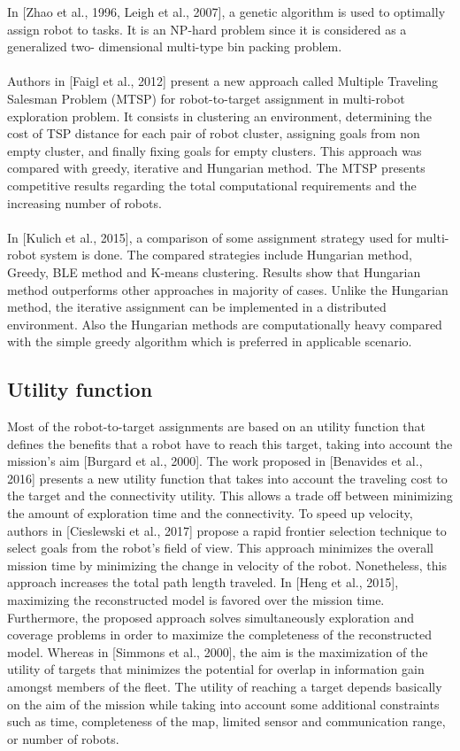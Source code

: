 \documentclass[11pt,openany]{book}
\begin{document}
In [Zhao et al., 1996, Leigh et al., 2007], a genetic algorithm is used to optimally assign robot to tasks. It is an NP-hard problem since it is considered as a generalized two- dimensional multi-type bin packing problem.\\\\
Authors in [Faigl et al., 2012] present a new approach called Multiple Traveling Salesman Problem (MTSP) for robot-to-target assignment in multi-robot exploration problem. It consists in clustering an environment, determining the cost of TSP distance for each pair of robot cluster, assigning goals from non empty cluster, and ﬁnally ﬁxing goals for empty clusters. This approach was compared with greedy, iterative and Hungarian method. The MTSP presents competitive results regarding the total computational requirements and the increasing number of robots.\\\\
In [Kulich et al., 2015], a comparison of some assignment strategy used for multi- robot system is done. The compared strategies include Hungarian method, Greedy, BLE method and K-means clustering. Results show that Hungarian method outperforms other approaches in majority of cases. Unlike the Hungarian method, the iterative assignment can be implemented in a distributed environment. Also the Hungarian methods are computationally heavy compared with the simple greedy algorithm which is preferred in applicable scenario.
\subsection{Utility function}
Most of the robot-to-target assignments are based on an utility function that deﬁnes the beneﬁts that a robot have to reach this target, taking into account the mission’s aim [Burgard et al., 2000]. The work proposed in [Benavides et al., 2016] presents a new utility function that takes into account the traveling cost to the target and the connectivity utility. This allows a trade oﬀ between minimizing the amount of exploration time and the connectivity. To speed up velocity, authors in [Cieslewski et al., 2017] propose a rapid frontier selection technique to select goals from the robot’s ﬁeld of view. This approach minimizes the overall mission time by minimizing the change in velocity of the robot. Nonetheless, this approach increases the total path length traveled. In [Heng et al., 2015], maximizing the reconstructed model is favored over the mission time. Furthermore, the proposed approach solves simultaneously exploration and coverage problems in order to maximize the completeness of the reconstructed model. Whereas in [Simmons et al., 2000], the aim is the maximization of the utility of targets that minimizes the potential for overlap in information gain amongst members of the ﬂeet. The utility of reaching a target depends basically on the aim of the mission while taking into account some additional constraints such as time, completeness of the map, limited sensor and communication range, or number of robots.
\end{document}
